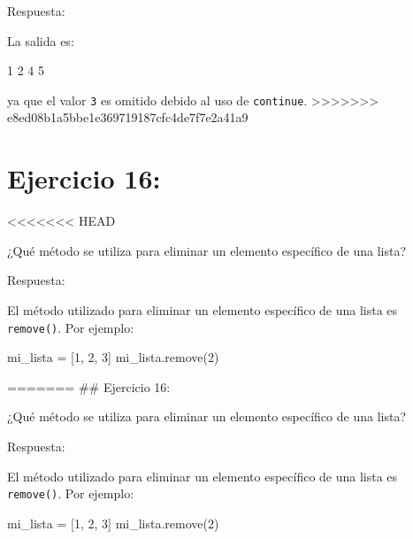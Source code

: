 \documentclass[
  a4paper,
  onepage,
  openany]{scrreprt}
\newenvironment{Shaded}{\begin{snugshade}}{\end{snugshade}}
\newcommand{\DecValTok}[1]{\textcolor[rgb]{0.68,0.00,0.00}{#1}}
\newcommand{\ExtensionTok}[1]{\textcolor[rgb]{0.00,0.23,0.31}{#1}}
\newcommand{\NormalTok}[1]{\textcolor[rgb]{0.00,0.23,0.31}{#1}}
\newcommand{\OperatorTok}[1]{\textcolor[rgb]{0.37,0.37,0.37}{#1}}
\begin{document}
Respuesta:

La salida es:

\begin{Shaded}
\begin{Highlighting}[]
\ExtensionTok{1}
\ExtensionTok{2}
\ExtensionTok{4}
\ExtensionTok{5}
\end{Highlighting}
\end{Shaded}

ya que el valor \texttt{3} es omitido debido al uso de
\texttt{continue}.
\textgreater\textgreater\textgreater\textgreater\textgreater\textgreater\textgreater{}
e8ed08b1a5bbe1e369719187cfc4de7f7e2a41a9

\hypertarget{ejercicio-16}{%
\chapter{Ejercicio 16:}\label{ejercicio-16}}

\textless\textless\textless\textless\textless\textless\textless{} HEAD

¿Qué método se utiliza para eliminar un elemento específico de una
lista?

Respuesta:

El método utilizado para eliminar un elemento específico de una lista es
\texttt{remove()}. Por ejemplo:

\begin{Shaded}
\begin{Highlighting}[]
\NormalTok{mi\_lista }\OperatorTok{=}\NormalTok{ [}\DecValTok{1}\NormalTok{, }\DecValTok{2}\NormalTok{, }\DecValTok{3}\NormalTok{]}
\NormalTok{mi\_lista.remove(}\DecValTok{2}\NormalTok{)}
\end{Highlighting}
\end{Shaded}

======= \#\# Ejercicio 16:

¿Qué método se utiliza para eliminar un elemento específico de una
lista?

Respuesta:

El método utilizado para eliminar un elemento específico de una lista es
\texttt{remove()}. Por ejemplo:

\begin{Shaded}
\begin{Highlighting}[]
\NormalTok{mi\_lista }\OperatorTok{=}\NormalTok{ [}\DecValTok{1}\NormalTok{, }\DecValTok{2}\NormalTok{, }\DecValTok{3}\NormalTok{]}
\NormalTok{mi\_lista.remove(}\DecValTok{2}\NormalTok{)}
\end{Highlighting}
\end{Shaded}
\end{document}
